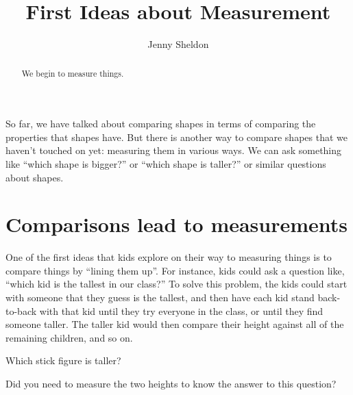 \documentclass{ximera}
\title{First Ideas about Measurement}
\author{Jenny Sheldon}
\begin{document}
\begin{abstract}
We begin to measure things.
\end{abstract}
\maketitle

So far, we have talked about comparing shapes in terms of comparing the properties that shapes have. But there is another way to compare shapes that we haven't touched on yet: measuring them in various ways. We can ask something like ``which shape is bigger?'' or ``which shape is taller?'' or similar questions about shapes. 

\section{Comparisons lead to measurements}
One of the first ideas that kids explore on their way to measuring things is to compare things by ``lining them up''. For instance, kids could ask a question like, ``which kid is the tallest in our class?'' To solve this problem, the kids could start with someone that they guess is the tallest, and then have each kid stand back-to-back with that kid until they try everyone in the class, or until they find someone taller. The taller kid would then compare their height against all of the remaining children, and so on.
\begin{question}
Which stick figure is taller?
\begin{center}
\end{center}
\begin{multipleChoice}
\end{multipleChoice}

Did you need to measure the two heights to know the answer to this question?
\begin{multipleChoice}
\end{multipleChoice}
\end{question}
\end{document}
